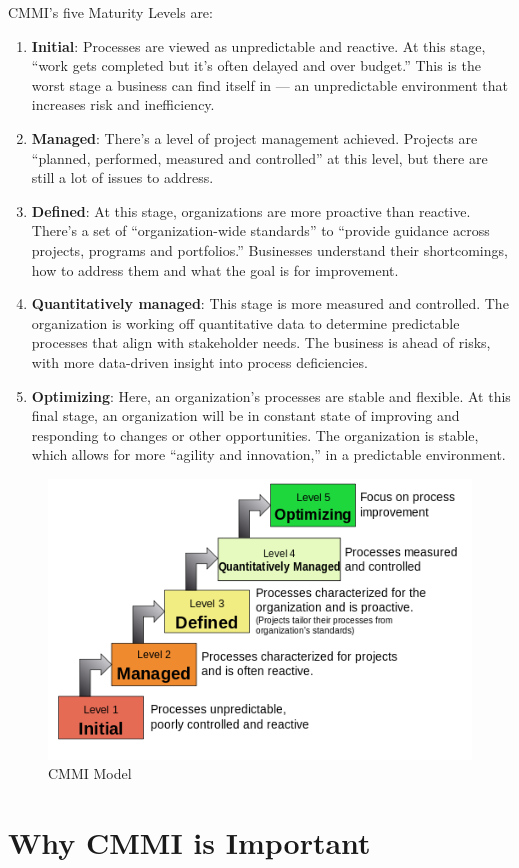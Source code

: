 \documentclass[11pt]{article}
\begin{document}
CMMI’s five Maturity Levels are:
\begin{enumerate}
\item \textbf{Initial}: Processes are viewed as unpredictable and reactive. At this stage, “work gets completed but it’s often delayed and over budget.” This is the worst stage a business can find itself in — an unpredictable environment that increases risk and inefficiency.
\item \textbf{Managed}: There’s a level of project management achieved. Projects are “planned, performed, measured and controlled” at this level, but there are still a lot of issues to address.
\item \textbf{Defined}: At this stage, organizations are more proactive than reactive. There’s a set of “organization-wide standards” to “provide guidance across projects, programs and portfolios.” Businesses understand their shortcomings, how to address them and what the goal is for improvement.

\item \textbf{Quantitatively managed}: This stage is more measured and controlled. The organization is working off quantitative data to determine predictable processes that align with stakeholder needs. The business is ahead of risks, with more data-driven insight into process deficiencies.

\item \textbf{Optimizing}: Here, an organization’s processes are stable and flexible. At this final stage, an organization will be in constant state of improving and responding to changes or other opportunities. The organization is stable, which allows for more “agility and innovation,” in a predictable environment.

\end{enumerate}


\begin{figure}[htp]
\centering
\includegraphics[scale=0.6]{images/CMMI.png}
\caption{CMMI Model}
\label{}
\end{figure}

\section{Why CMMI is Important}




\end{document}
